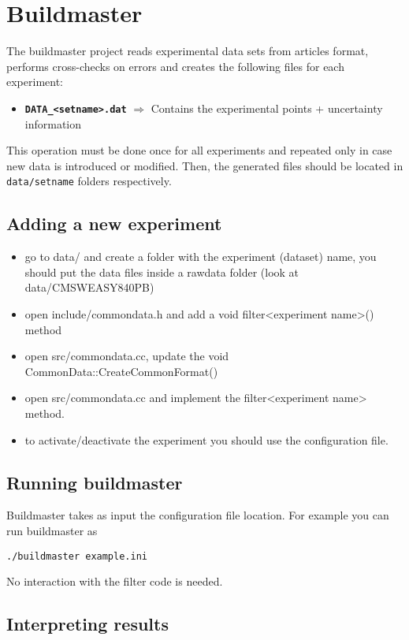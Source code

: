 
\section{Buildmaster}

The buildmaster project reads experimental data sets from articles format,
performs cross-checks on errors and creates the following files for
each experiment: 
\begin{itemize}
\item \texttt{\textbf{DATA\_<setname>.dat}} $\Rightarrow$ Contains the
experimental points + uncertainty information
\end{itemize}
This operation must be done once for all experiments and repeated
only in case new data is introduced or modified. Then, the generated
files should be located in \texttt{data/setname} folders respectively.

\subsection{Adding a new experiment}
\begin{itemize}
  \item go to data/ and create a folder with the experiment (dataset) name, you should put the data files inside a rawdata folder (look at data/CMSWEASY840PB)
  \item open include/commondata.h and add a void filter<experiment name>() method
  \item open src/commondata.cc, update the void CommonData::CreateCommonFormat()
  \item open src/commondata.cc and implement the filter<experiment name> method.
  \item to activate/deactivate the experiment you should use the configuration file.
\end{itemize}

\subsection{Running buildmaster}

Buildmaster takes as input the configuration file location. For example you can
run buildmaster as

\begin{lstlisting}
./buildmaster example.ini
\end{lstlisting}
No interaction with the filter code is needed.

\subsection{Interpreting results}

